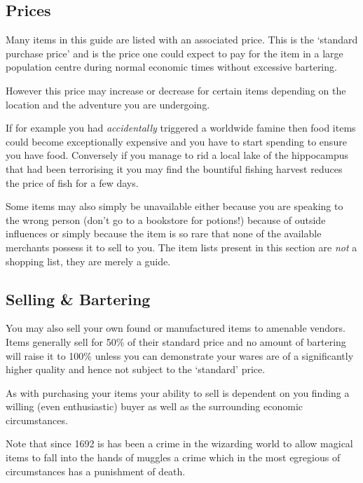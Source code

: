 \subsection{Prices}

Many items in this guide are listed with an associated price. This is the `standard purchase price'\comma{} and is the price one could expect to pay for the item in a large population centre\comma{} during normal economic times\comma{} without excessive bartering. 

However\comma{} this price may increase or decrease for certain items\comma{} depending on the location and the adventure you are undergoing. 

If\comma{} for example\comma{} you had {\it accidentally} triggered a worldwide famine\comma{} then food items could become exceptionally expensive and you have to start spending  to ensure you have food. Conversely\comma{} if you manage to rid a local lake of the hippocampus that had been terrorising it\comma{} you may find the bountiful fishing harvest reduces the price of fish for a few days. 

Some items may also simply be unavailable \minus{} either because you are speaking to the wrong person (don't go to a bookstore for potions!)\comma{} because of outside influences\comma{} or simply because the item is so rare that none of the available merchants possess it to sell to you. The item lists present in this section are {\it not} a shopping list, they are merely a guide. 

\subsection{Selling \& Bartering}

You may also sell your own found or manufactured items to amenable vendors. Items generally sell for 50\% of their standard price\comma{} and no amount of bartering will raise it to 100\%\comma{} unless you can demonstrate your wares are of a significantly higher quality\comma{} and hence not subject to the `standard' price. 

As with purchasing your items\comma{} your ability to sell is dependent on you finding a willing (even enthusiastic) buyer\comma{} as well as the surrounding economic circumstances. 

Note that since 1692 is has been a crime in the wizarding world to allow magical items to fall into the hands of muggles \minus{} a crime which\comma{} in the most egregious of circumstances\comma{} has a punishment of death. 

